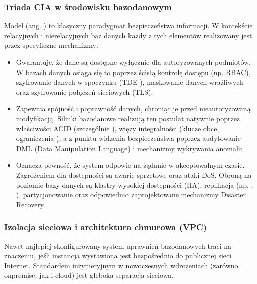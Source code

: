 \documentclass[letterpaper,10pt,polish]{sphinxmanual}
\begin{document}
\subsubsection{Triada CIA w środowisku bazodanowym}
\label{\detokenize{rozdzia_u0142_2/rozdzia_u0142_27/rozdzial_1:triada-cia-w-srodowisku-bazodanowym}}
\sphinxAtStartPar
Model  (ang. ) to klasyczny paradygmat bezpieczeństwa informacji. W kontekście relacyjnych i nierelacyjnych baz danych każdy z tych elementów realizowany jest przez specyficzne mechanizmy:
\begin{itemize}
\item {} 
\sphinxAtStartPar
{} Gwarantuje, że dane są dostępne wyłącznie dla autoryzowanych podmiotów. W bazach danych osiąga się to poprzez ścisłą kontrolę dostępu (np. RBAC), szyfrowanie danych w spoczynku (TDE \sphinxhyphen{} ), maskowanie danych wrażliwych oraz szyfrowanie połączeń sieciowych (TLS).

\item {} 
\sphinxAtStartPar
{} Zapewnia spójność i poprawność danych, chroniąc je przed nieautoryzowaną modyfikacją. Silniki bazodanowe realizują ten postulat natywnie poprzez właściwości ACID (szczególnie ), więzy integralności (klucze obce, ograniczenia ), a z punktu widzenia bezpieczeństwa \textendash{} poprzez audytowanie DML (Data Manipulation Language) i mechanizmy wykrywania anomalii.

\item {} 
\sphinxAtStartPar
{} Oznacza pewność, że system odpowie na żądanie w akceptowalnym czasie. Zagrożeniem dla dostępności są awarie sprzętowe oraz ataki DoS. Obroną na poziomie bazy danych są klastry wysokiej dostępności (HA), replikacja (np. , ), partycjonowanie oraz odpowiednio zaprojektowane mechanizmy Disaster Recovery.

\end{itemize}


\subsubsection{Izolacja sieciowa i architektura chmurowa (VPC)}
\label{\detokenize{rozdzia_u0142_2/rozdzia_u0142_27/rozdzial_1:izolacja-sieciowa-i-architektura-chmurowa-vpc}}
\sphinxAtStartPar
Nawet najlepiej skonfigurowany system uprawnień bazodanowych traci na znaczeniu, jeśli instancja wystawiona jest bezpośrednio do publicznej sieci Internet. Standardem inżynieryjnym w nowoczesnych wdrożeniach (zarówno on\sphinxhyphen{}premise, jak i cloud) jest głęboka separacja sieciowa.
\end{document}
